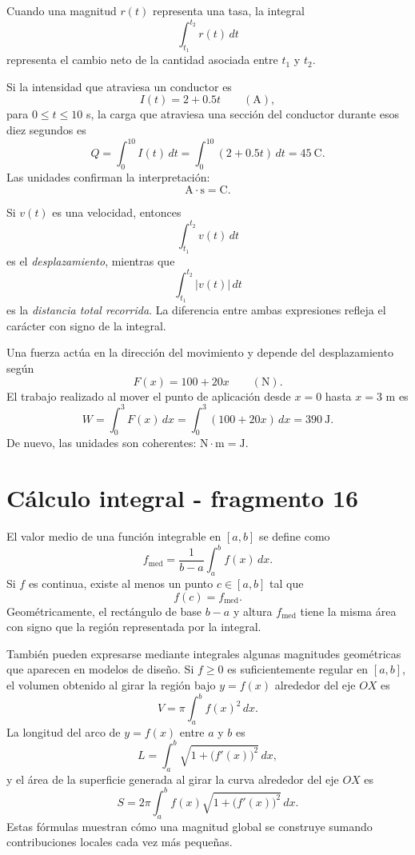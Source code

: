 Cuando una magnitud $r(t)$ representa una tasa, la integral
\[
\int_{t_1}^{t_2}r(t)\,dt
\]
representa el cambio neto de la cantidad asociada entre $t_1$ y $t_2$.

\begin{example}
Si la intensidad que atraviesa un conductor es
\[
I(t)=2+0.5t\qquad (\mathrm{A}),
\]
para $0\leq t\leq10$ s, la carga que atraviesa una sección del conductor durante esos diez segundos es
\[
Q=\int_0^{10}I(t)\,dt
=
\int_0^{10}(2+0.5t)\,dt
=45\ \mathrm{C}.
\]
Las unidades confirman la interpretación:
\[
\mathrm{A}\cdot\mathrm{s}=\mathrm{C}.
\]
\end{example}

Si $v(t)$ es una velocidad, entonces
\[
\int_{t_1}^{t_2}v(t)\,dt
\]
es el \emph{desplazamiento}, mientras que
\[
\int_{t_1}^{t_2}|v(t)|\,dt
\]
es la \emph{distancia total recorrida}. La diferencia entre ambas expresiones refleja el carácter con signo de la integral.

\begin{example}
Una fuerza actúa en la dirección del movimiento y depende del desplazamiento según
\[
F(x)=100+20x\qquad (\mathrm{N}).
\]
El trabajo realizado al mover el punto de aplicación desde $x=0$ hasta $x=3$ m es
\[
W=\int_0^3F(x)\,dx
=
\int_0^3(100+20x)\,dx
=390\ \mathrm{J}.
\]
De nuevo, las unidades son coherentes: $\mathrm{N}\cdot\mathrm{m}=\mathrm{J}$.
\end{example}


\section{Cálculo integral - fragmento 16}
El valor medio de una función integrable en $[a,b]$ se define como
\[
\boxed{f_{\mathrm{med}}=\frac1{b-a}\int_a^b f(x)\,dx.}
\]
Si $f$ es continua, existe al menos un punto $c\in[a,b]$ tal que
\[
f(c)=f_{\mathrm{med}}.
\]
Geométricamente, el rectángulo de base $b-a$ y altura $f_{\mathrm{med}}$ tiene la misma área con signo que la región representada por la integral.

También pueden expresarse mediante integrales algunas magnitudes geométricas que aparecen en modelos de diseño. Si $f\geq0$ es suficientemente regular en $[a,b]$, el volumen obtenido al girar la región bajo $y=f(x)$ alrededor del eje $OX$ es
\[
V=\pi\int_a^b f(x)^2\,dx.
\]
La longitud del arco de $y=f(x)$ entre $a$ y $b$ es
\[
L=\int_a^b\sqrt{1+\bigl(f'(x)\bigr)^2}\,dx,
\]
y el área de la superficie generada al girar la curva alrededor del eje $OX$ es
\[
S=2\pi\int_a^b f(x)\sqrt{1+\bigl(f'(x)\bigr)^2}\,dx.
\]
Estas fórmulas muestran cómo una magnitud global se construye sumando contribuciones locales cada vez más pequeñas.

